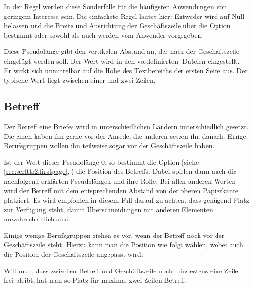 In der Regel werden diese Sonderfälle für die häufigsten Anwendungen von
geringem Interesse sein. Die einfachste Regel lautet hier:
Entweder wird  auf Null belassen und die Breite und
Ausrichtung der Geschäftszeile über die Option
 bestimmt oder sowohl  als
auch  werden vom Anwender vorgegeben.%
\EndIndexGroup


\begin{Declaration}
\end{Declaration}
Diese Pseudolänge gibt den vertikalen Abstand an, der nach der Geschäftszeile
eingefügt werden soll. Der Wert wird in den vordefinierten
-Dateien
eingestellt. Er wirkt sich unmittelbar auf die Höhe des Textbereichs der
ersten Seite aus. Der typische Wert liegt zwischen einer und zwei Zeilen.%
\EndIndexGroup
%
\EndIndexGroup


\subsection{Betreff}
%
\BeginIndexGroup
{}

Der Betreff eine Briefes wird in unterschiedlichen Ländern unterschiedlich
gesetzt. Die einen haben ihn gerne vor der Anrede, die anderen setzen ihn
danach. Einige Berufsgruppen wollen ihn teilweise sogar vor der Geschäftszeile
haben.

\begin{Declaration}
\end{Declaration}
%
Ist der Wert dieser Pseudolänge 0, so bestimmt die
Option
%
 (siehe
\autoref{sec:scrlttr2.firstpage}, ) die
Position des Betreffs. Dabei spielen dann auch die nachfolgend erklärten
Pseudolängen  und  ihre
Rolle. Bei allen anderen Werten wird der Betreff mit dem entsprechenden
Abstand von der oberen Papierkante platziert. Es wird
empfohlen in diesem Fall darauf zu achten, dass genügend Platz zur Verfügung
steht, damit Überschneidungen mit anderen Elementen unwahrscheinlich sind.
\begin{Example}
  Einige wenige Berufsgruppen ziehen es vor, wenn der Betreff noch vor der
  Geschäftszeile steht. Hierzu kann man die Position wie folgt wählen, wobei
  auch die Position der Geschäftszeile angepasst wird:
  Will man, dass zwischen Betreff und Geschäftszeile noch mindestens eine
  Zeile frei bleibt, hat man so Platz für maximal zwei Zeilen Betreff.
\end{Example}
\EndIndexGroup


